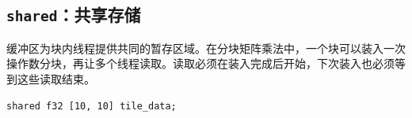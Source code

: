 \subsection*{\texttt{shared}：共享存储}

\co@shared@ 缓冲区为块内线程提供共同的暂存区域。在分块矩阵乘法中，一个块可以装入一次操作数分块，再让多个线程读取。读取必须在装入完成后开始，下次装入也必须等到这些读取结束。

\begin{lstlisting}[language=croqtile,caption={共享存储声明}]
shared f32 [10, 10] tile_data;
\end{lstlisting}
